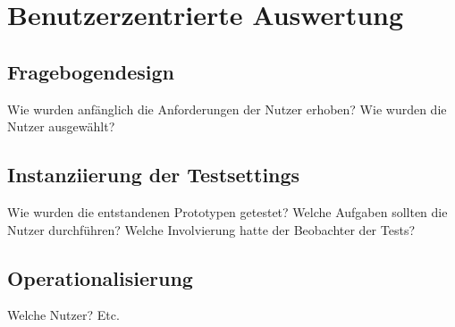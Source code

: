 \chapter{Benutzerzentrierte Auswertung} %

\section{Fragebogendesign} %
Wie wurden anfänglich die Anforderungen der Nutzer erhoben? Wie wurden die Nutzer ausgewählt?

\section{Instanziierung der Testsettings} %
Wie wurden die entstandenen Prototypen getestet? Welche Aufgaben sollten die Nutzer durchführen? Welche Involvierung hatte der Beobachter der Tests?

\section{Operationalisierung}
Welche Nutzer? Etc.